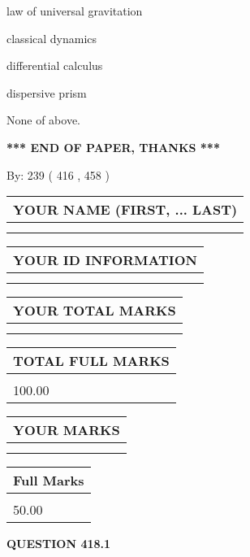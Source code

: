 \documentclass[12pt]{article}
\begin{document}
 
law of universal gravitation
 
 
classical dynamics
 
 
differential calculus
 
 
dispersive prism
 
 
 None of above.
 
 
   
   
\vspace{1.0in} 
{\textbf{\large{ *** END OF PAPER, THANKS *** }}} 
   
   
\hspace{1.0in} By: 
 239 ( 416 ,  458 )
   
   
   
   
\newpage 
\setcounter{page}{ 
   418001 } 
   
   
   
   
\noindent\begin{tabular}{|l|}
\hline
YOUR NAME (FIRST, ... LAST)  \\
\hline
 \\ 
 \\ 
\hline
\end{tabular}
\hspace{0.05in} \begin{tabular}{|l|}
\hline
 YOUR   ID   INFORMATION  \\
\hline
 \\ 
 \\ 
\hline
\end{tabular}
   
   
\vspace{0.2in}\noindent\begin{tabular}{|l|}
\hline
YOUR TOTAL MARKS  \\
\hline
 \\ 
 \\ 
\hline
\end{tabular}
\hspace{0.05in} \begin{tabular}{|l|}
\hline
TOTAL FULL MARKS  \\
\hline
 \\ 
100.00 \\
\hline
\end{tabular}
  
\vspace{0.2in}
  
\noindent\begin{tabular}{|l|}
\hline
 YOUR MARKS  \\
\hline
 \\ 
 \\ 
\hline
\end{tabular}
\hspace{0.05in} \begin{tabular}{|l|}
\hline
 Full Marks  \\
\hline
 \\ 
50.00 \\
\hline
\end{tabular}
{\textbf{\Large{QUESTION
418.1 
}}}
  
\end{document}
